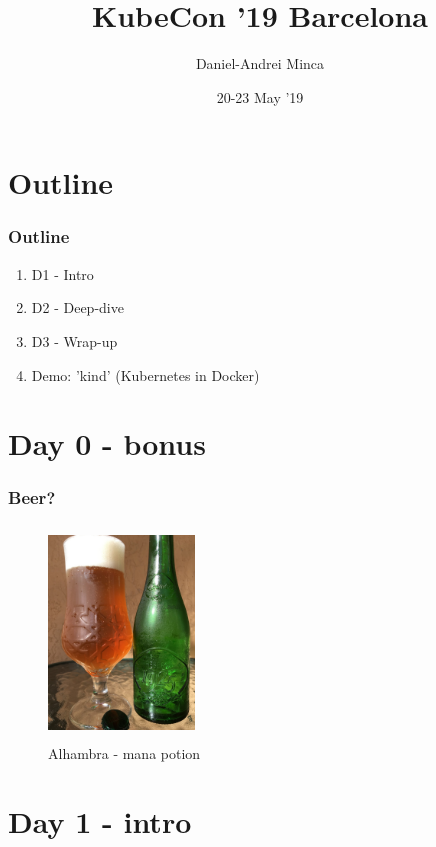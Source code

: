\documentclass[default]{beamer}
\title{KubeCon '19 Barcelona}
\author{Daniel-Andrei Minca}
\institute{Site Reliability Engineer @ GfK SE}
\date{20-23 May '19}
\begin{document}
\begin{frame}
  \titlepage
\end{frame}

\section[Outline]{Outline}
\begin{frame}
  \frametitle{Outline}
  \begin{enumerate}
    \item D1 - Intro
    \item D2 - Deep-dive
    \item D3 - Wrap-up
    \item Demo: 'kind' (Kubernetes in Docker)\footnotemark
  \end{enumerate}
\end{frame}


\section{Day 0 - bonus}
\begin{frame}
  \frametitle{Beer?}
  \begin{figure}
    \includegraphics[width=110pt,height=160pt]{src/kubecon/static/beer.jpg}
    \caption{Alhambra - mana potion}
  \end{figure}
\end{frame}

\section{Day 1 - intro}
\end{document}
